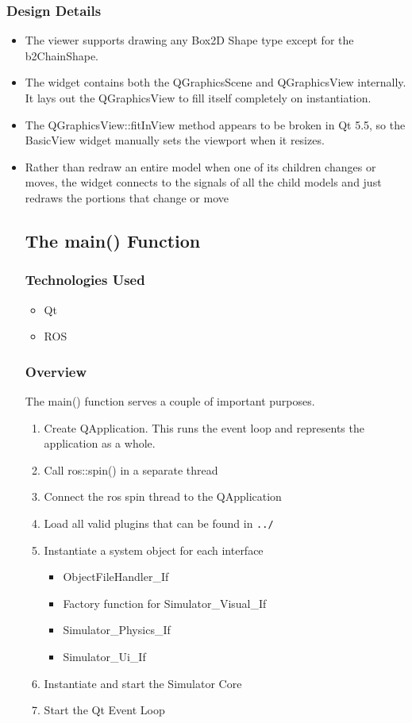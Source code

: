 \subsubsection*{Design Details}
\begin{itemize}
	\item The viewer supports drawing any Box2D Shape type except for the b2ChainShape. 
	\item The widget contains both the QGraphicsScene and QGraphicsView internally. It lays out the QGraphicsView to fill itself completely on instantiation.
	\item The QGraphicsView::fitInView method appears to be broken in Qt 5.5, so the BasicView widget manually sets the viewport when it resizes.
	\item Rather than redraw an entire model when one of its children changes or moves, the widget connects to the signals of all the child models and just redraws the portions that change or move

\subsection{The main() Function}
\subsubsection*{Technologies Used}
\begin{itemize}
	\item Qt
	\item ROS
\end{itemize}

\subsubsection*{Overview}
The main() function serves a couple of important purposes.
\begin{enumerate}
	\item Create QApplication. This runs the event loop and represents the application as a whole.
	\item Call ros::spin() in a separate thread
	\item Connect the ros spin thread to the QApplication
	\item Load all valid plugins that can be found in \lstinline|../|
	\item Instantiate a system object for each interface
	\begin{itemize}
		\item ObjectFileHandler\_If
		\item Factory function for Simulator\_Visual\_If
		\item Simulator\_Physics\_If
		\item Simulator\_Ui\_If
	\end{itemize}
	\item Instantiate and start the Simulator Core
	\item Start the Qt Event Loop
\end{enumerate}


\end{itemize}
